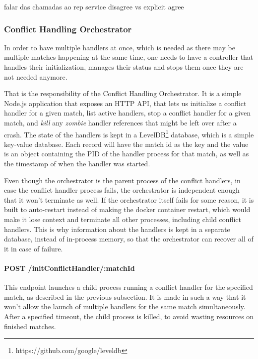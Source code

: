 {\Huge falar das chamadas ao rep service disagree vs explicit agree}


\subsubsection{Conflict Handling Orchestrator}

In order to have multiple handlers at once, which is needed as there may be multiple matches happening at the same time, one needs to have a controller that handles their initialization, manages their status and stops them once they are not needed anymore.

That is the responsibility of the Conflict Handling Orchestrator. It is a simple Node.js application that exposes an HTTP API, that lets us initialize a conflict handler for a given match, list active handlers, stop a conflict handler for a given match, and \textit{kill} any \textit{zombie} handler references that might be left over after a crash. The state of the handlers is kept in a LevelDB\footnote{https://github.com/google/leveldb} database, which is a simple key-value database. Each record will have the match id as the key and the value is an object containing the PID of the handler process for that match, as well as the timestamp of when the handler was started.

Even though the orchestrator is the parent process of the conflict handlers, in case the conflict handler process fails, the orchestrator is independent enough that it won't terminate as well. If the orchestrator itself fails for some reason, it is built to auto-restart instead of making the docker container restart, which would make it lose context and terminate all other processes, including child conflict handlers. This is why information about the handlers is kept in a separate database, instead of in-process memory, so that the orchestrator can recover all of it in case of failure.

\paragraph{POST /initConflictHandler/:matchId}
This endpoint launches a child process running a conflict handler for the specified match, as described in the previous subsection. It is made in such a way that it won't allow the launch of multiple handlers for the same match simultaneously. After a specified timeout, the child process is killed, to avoid wasting resources on finished matches.

